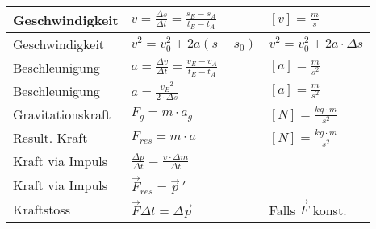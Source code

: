 \noindent
\begin{tabularx}{\columnwidth}{@{}XXX@{}}
	Geschwindigkeit                           & $ v = \frac{\Delta s}{\Delta t} = \frac{s_E - s_A}{t_E - t_A} $  & $ [v] = \frac{m}{s} $                                                                                                              \\ \hline
	Geschwindigkeit                           & $v^2 = v^2_0 + 2a(s-s_0)$                                        & $v^2 = v^2_0 + 2a\cdot \Delta s$                                                                                                   \\ \hline
	Beschleunigung                            & $ a = \frac{\Delta v}{\Delta t} = \frac{v_E - v_A}{t_E - t_A} $  & $ [a] = \frac{m}{s^2} $                                                                                                            \\ \hline
	Beschleunigung                            & $ a = \frac{{v_E}^2}{2\cdot\Delta s} $                           & $ [a] = \frac{m}{s^2} $                                                                                                            \\ \hline
	Gravitationskraft                         & $ F_g = m\cdot a_g $                                             & $ [N] = \frac{kg\cdot m}{s^2} $                                                                                                    \\ \hline
	Result. Kraft                             & $ F_{res} = m\cdot a $                                           & $ [N] = \frac{kg\cdot m}{s^2} $                                                                                                    \\ \hline
	Kraft via Impuls                          & $ \frac{\Delta p}{\Delta t} = \frac{v\cdot \Delta m}{\Delta t} $                                                                                                                                      \\ \hline
	Kraft via Impuls                          & $\vec{F}_{res} = \vec{p}\,'$                                                                                                                                                                          \\ \hline
	Kraftstoss                                & $ \vec{F}\Delta t = \Delta\vec{p} $                              & Falls $\vec{F}$ konst.                                                                                                             \\ \hline

\end{tabularx}

